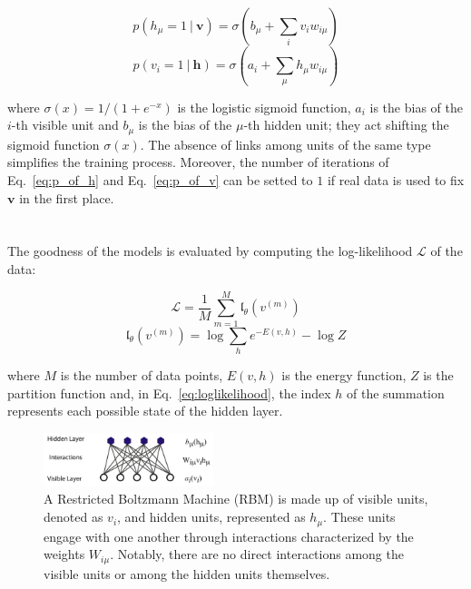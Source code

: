 \documentclass[prl,twocolumn]{revtex4-1}
\begin{document}
\begin{equation}
	p(h_\mu=1\ |\ \mathbf{v}) = \sigma(b_\mu + \sum_{i}v_iw_{i\mu})
	\label{eq:p_of_h}
\end{equation}
\begin{equation}
	p(v_i=1\ |\ \mathbf{h}) = \sigma(a_i + \sum_{\mu}h_{\mu}w_{i\mu})
	\label{eq:p_of_v}
\end{equation}

where $\sigma(x)=1/(1+e^{-x})$ is the logistic sigmoid function, $a_i$ is the bias of the $i$-th visible unit and $b_\mu$ is the bias of the $\mu$-th hidden unit; they act shifting the sigmoid function $\sigma(x)$. The absence of links among units of the same type simplifies the training process. Moreover, the number of iterations of Eq.~\ref{eq:p_of_h} and Eq.~\ref{eq:p_of_v} can be setted to $1$ if real data is used to fix $\mathbf{v}$ in the first place.
\\
\\
\\
The goodness of the models is evaluated by computing the log-likelihood $\mathcal{L}$ of the data:

\begin{equation}
	\mathcal{L}=\frac{1}{M}\sum_{m=1}^{M}{\mathfrak{l}_{\theta}(v^{(m)})}
	\label{eq:Loglikelihood}
\end{equation}
\begin{equation}
	\mathfrak{l}_{\theta}(v^{(m)})=\log\sum_{h}{e^{-E(v,h)}-\log{Z}}
	\label{eq:loglikelihood}
\end{equation}

where $M$ is the number of data points, $E(v,h)$ is the energy function, $Z$ is the partition function and, in Eq.~\ref{eq:loglikelihood}, the index $h$ of the summation represents each possible state of the hidden layer.

\begin{figure}[!tb]
	\includegraphics[width=0.44\textwidth]{RBM_structure.png}
	\caption{A Restricted Boltzmann Machine (RBM) is made up of visible units, denoted as $v_i$, and hidden units, represented as $h_\mu$. These units engage with one another through interactions characterized by the weights $W_{i\mu}$. Notably, there are no direct interactions among the visible units or among the hidden units themselves.}
	\label{fig:RBM_architecture}
\end{figure}
\end{document}
